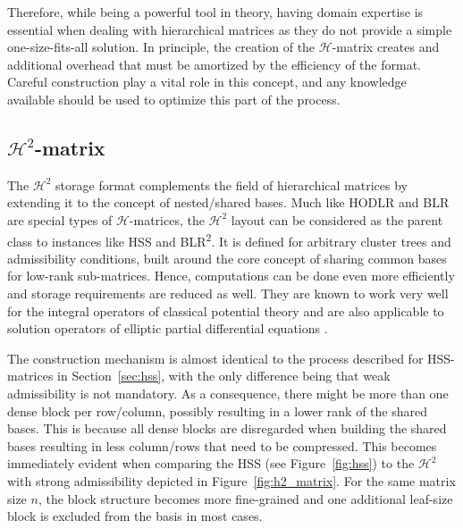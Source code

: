 Therefore, while being a powerful tool in theory, having domain expertise is essential when dealing with hierarchical matrices as they do not provide a simple one-size-fits-all solution. In principle, the creation of the $\mathcal{H}$-matrix creates and additional overhead that must be amortized by the efficiency of the format. Careful construction play a vital role in this concept, and any knowledge available should be used to optimize this part of the process.


\subsection{\texorpdfstring{$\mathcal{H}^2$}{H2}-matrix}
\label{sec:h2_matrix}

The $\mathcal{H}^2$ storage format complements the field of hierarchical matrices by extending it to the concept of nested/shared bases. Much like HODLR and BLR are special types of $\mathcal{H}$-matrices, the  $\mathcal{H}^2$ layout can be considered as the parent class to instances like HSS and BLR\textsuperscript{2}. It is defined for arbitrary cluster trees and admissibility conditions, built around the core concept of sharing common bases for low-rank sub-matrices. Hence, computations can be done even more efficiently and storage requirements are reduced as well. They are known to work very well for the integral operators of classical potential theory and are also applicable to solution operators of elliptic partial differential equations \cite{borm_h2-matrix_2006}.

The construction mechanism is almost identical to the process described for HSS-matrices in Section~\hyperref[sec:hss]{\ref{sec:hss}}, with the only difference being that weak admissibility is not mandatory. As a consequence, there might be more than one dense block per row/column, possibly resulting in a lower rank of the shared bases. This is because all dense blocks are disregarded when building the shared bases resulting in less column/rows that need to be compressed. This becomes immediately evident when comparing the HSS (see Figure~\hyperref[fig:hss]{\ref{fig:hss}}) to the $\mathcal{H}^2$ with strong admissibility depicted in Figure~\hyperref[fig:h2_matrix]{\ref{fig:h2_matrix}}. For the same matrix size $n$, the block structure becomes more fine-grained and one additional leaf-size block is excluded from the basis in most cases.


